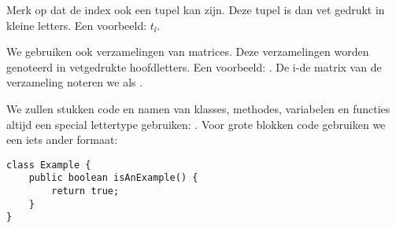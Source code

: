 Merk op dat de index ook een tupel kan zijn. Deze tupel is dan vet gedrukt in kleine letters. Een voorbeeld: $t_{\ii}$.

We gebruiken ook verzamelingen van matrices. Deze verzamelingen worden genoteerd in vetgedrukte hoofdletters. Een voorbeeld: \UUU{}. De i-de matrix van de verzameling \UUU{} noteren we als .

We zullen stukken code en namen van klasses, methodes, variabelen en functies altijd een special lettertype gebruiken: . Voor grote blokken code gebruiken we een iets ander formaat:
\begin{lstlisting}
class Example {
    public boolean isAnExample() {
        return true;
    }
}
\end{lstlisting}
